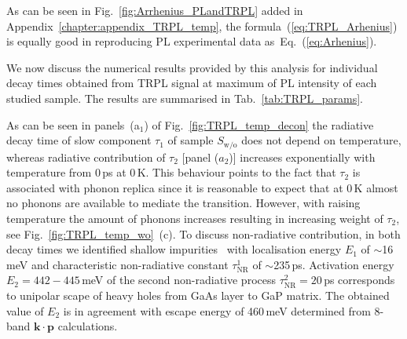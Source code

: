 As can be seen in Fig.~\ref{fig:Arrhenius_PLandTRPL} added in Appendix~\ref{chapter:appendix_TRPL_temp}, the formula~(\ref{eq:TRPL_Arhenius}) is equally good in reproducing PL experimental data as~Eq.~(\ref{eq:Arhenius}). 



We now discuss the numerical results provided by this analysis for individual decay times obtained from TRPL signal at maximum of PL intensity of each studied sample. The results are summarised in Tab.~\ref{tab:TRPL_params}. 

As can be seen in panels~(a$_1$) of Fig.~\ref{fig:TRPL_temp_decon} the radiative decay time of slow component $\tau_1$ of sample $S_\mathrm{w/o}$ does not depend on temperature, whereas radiative contribution of $\tau_2$ [panel ($a_2$)] increases exponentially with temperature from 0$\,$ps at 0$\,$K. This behaviour points to the fact that $\tau_2$ is associated with phonon replica since it is reasonable to expect that at 0$\,$K almost no phonons are available to mediate the transition. However, with raising temperature the amount of phonons increases resulting in increasing weight of $\tau_2$, see Fig.~\ref{fig:TRPL_temp_wo}~(c). To discuss non-radiative contribution, in both decay times we identified shallow impurities~\citep{Cardona} with localisation energy $E_1$ of $\sim$16$\,$meV and characteristic non-radiative constant $\tau^1_\mathrm{NR}$ of $\sim$235$\,$ps. Activation energy $E_2=442-445$$\,$meV of the second non-radiative process $\tau^2_\mathrm{NR}=20$$\,$ps corresponds to unipolar scape of heavy holes from GaAs layer to GaP matrix. The obtained value of $E_2$ is in agreement with escape energy of 460$\,$meV determined from 8-band $\mathbf{k\cdot p}$ calculations.

